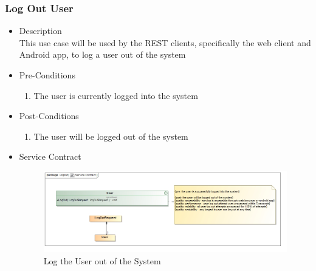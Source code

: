 \documentclass[a4paper,10pt]{article}
\begin{document}
\subsubsection{Log Out User}
	\begin{itemize}
		\item Description\\
			This use case will be used by the REST clients, specifically the web client and Android app, to log a user out of the system
		\item Pre-Conditions
			\begin{enumerate}
				\item The user is currently logged into the system
			\end{enumerate}
		\item Post-Conditions
			\begin{enumerate}
				\item The user will be logged out of the system
						
			\end{enumerate}
		\item Service Contract
			\begin{figure}[H]
				\includegraphics[scale=0.5]{Log_Out}
				\caption{Log the User out of the System}
			\end{figure}
	\end{itemize}
\end{document}
